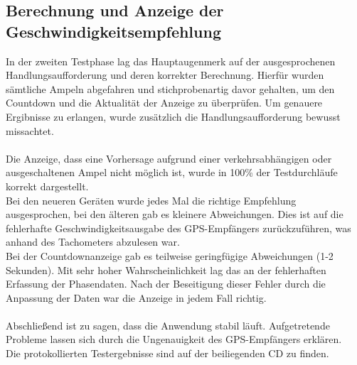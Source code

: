 \subsection{Berechnung und Anzeige der Geschwindigkeitsempfehlung}
In der zweiten Testphase lag das Hauptaugenmerk auf der ausgesprochenen Handlungsaufforderung und deren korrekter Berechnung. Hierfür wurden sämtliche Ampeln abgefahren und stichprobenartig davor gehalten, um den Countdown und die Aktualität der Anzeige zu überprüfen. Um genauere Ergibnisse zu erlangen, wurde zusätzlich die Handlungsaufforderung bewusst missachtet.\\\\  
Die Anzeige, dass eine Vorhersage aufgrund einer verkehrsabhängigen oder ausgeschaltenen Ampel nicht möglich ist, wurde in 100\% der Testdurchläufe korrekt dargestellt.\\ 
Bei den neueren Geräten wurde jedes Mal die richtige Empfehlung ausgesprochen, bei den älteren gab es kleinere Abweichungen. Dies ist auf die fehlerhafte Geschwindigkeitsausgabe des \gls{GPS}-Empfängers zurückzuführen, was anhand des Tachometers abzulesen war. \\
Bei der Countdownanzeige gab es teilweise geringfügige Abweichungen (1-2 Sekunden). Mit sehr hoher Wahrscheinlichkeit lag das an der fehlerhaften Erfassung der Phasendaten. Nach der Beseitigung dieser Fehler durch die Anpassung der Daten war die Anzeige in jedem Fall richtig.\\\\
Abschließend ist zu sagen, dass die Anwendung stabil läuft. Aufgetretende Probleme lassen sich durch die Ungenauigkeit des \gls{GPS}-Empfängers erklären.\\
Die protokollierten Testergebnisse sind auf der beiliegenden CD zu finden.
